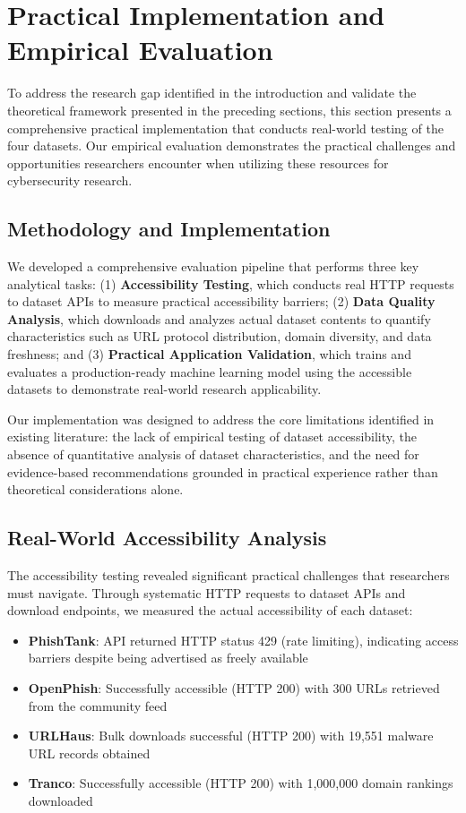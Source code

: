 \documentclass[journal,article,submit,pdftex,moreauthors]{Definitions/mdpi}
\begin{document}
\section{Practical Implementation and Empirical Evaluation}

To address the research gap identified in the introduction and validate the theoretical framework presented in the preceding sections, this section presents a comprehensive practical implementation that conducts real-world testing of the four datasets. Our empirical evaluation demonstrates the practical challenges and opportunities researchers encounter when utilizing these resources for cybersecurity research.

\subsection{Methodology and Implementation}

We developed a comprehensive evaluation pipeline that performs three key analytical tasks: (1) \textbf{Accessibility Testing}, which conducts real HTTP requests to dataset APIs to measure practical accessibility barriers; (2) \textbf{Data Quality Analysis}, which downloads and analyzes actual dataset contents to quantify characteristics such as URL protocol distribution, domain diversity, and data freshness; and (3) \textbf{Practical Application Validation}, which trains and evaluates a production-ready machine learning model using the accessible datasets to demonstrate real-world research applicability.

Our implementation was designed to address the core limitations identified in existing literature: the lack of empirical testing of dataset accessibility, the absence of quantitative analysis of dataset characteristics, and the need for evidence-based recommendations grounded in practical experience rather than theoretical considerations alone.

\subsection{Real-World Accessibility Analysis}

The accessibility testing revealed significant practical challenges that researchers must navigate. Through systematic HTTP requests to dataset APIs and download endpoints, we measured the actual accessibility of each dataset:

\begin{itemize}
\item \textbf{PhishTank}: API returned HTTP status 429 (rate limiting), indicating access barriers despite being advertised as freely available
\item \textbf{OpenPhish}: Successfully accessible (HTTP 200) with 300 URLs retrieved from the community feed
\item \textbf{URLHaus}: Bulk downloads successful (HTTP 200) with 19,551 malware URL records obtained
\item \textbf{Tranco}: Successfully accessible (HTTP 200) with 1,000,000 domain rankings downloaded
\end{itemize}
\end{document}
